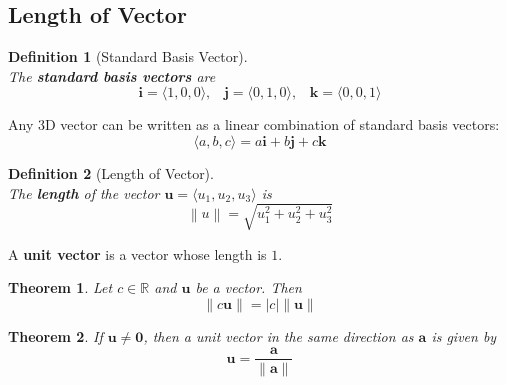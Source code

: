 \documentclass[12pt]{article}
\newcommand\norm[1]{\left\lVert#1\right\rVert}
\newtheorem{definition}{Definition}[section]
\newtheorem{theorem}{Theorem}[section]
\theoremstyle{definition}
\newcommand\ve[1]{\mathbf{#1}}
\begin{document}
\subsection{Length of Vector}
\begin{definition}[Standard Basis Vector]
\hfill\\\normalfont The \textbf{standard basis vectors} are
\[
\ve{i}=\langle 1,0,0\rangle,\;\;\;\ve{j}=\langle 0,1,0\rangle,\;\;\;\ve{k}=\langle 0,0,1\rangle
\]
\end{definition}
Any 3D vector can be written as a linear combination of standard basis vectors:
\[
\langle a, b, c\rangle =a\ve{i}+b\ve{j}+c\ve{k} 
\]
\begin{definition}[Length of Vector]
\hfill\\\normalfont The \textbf{length} of the vector $\ve{u}=\langle u_1,u_2,u_3\rangle$ is
\[
\norm{u}=\sqrt{u_1^2+u_2^2+u_3^2}
\]
\end{definition}
A \textbf{unit vector} is a vector whose length is $1$.
\begin{theorem}\normalfont Let $c\in\mathbb{R}$ and $\ve{u}$ be a vector. Then
\[
\norm{c\ve{u}}=|c|\norm{\ve{u}}
\]
\end{theorem}
\begin{theorem}\normalfont If $\ve{u}\neq \ve{0}$, then a unit vector in the same direction as $\ve{a}$ is given by
\[
\ve{u}=\frac{\ve{a}}{\norm{\ve{a}}}
\]
\end{theorem}
\end{document}
